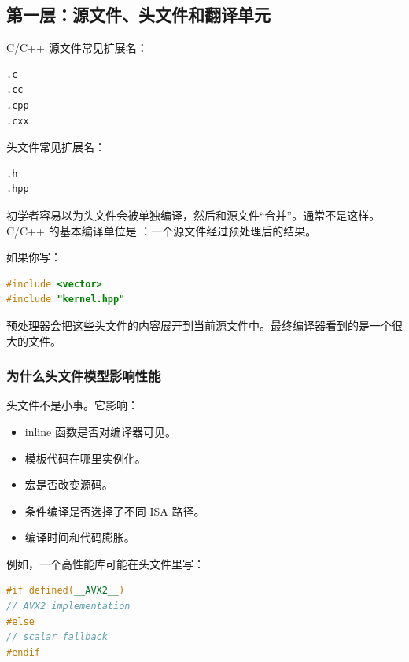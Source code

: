 \subsection{第一层：源文件、头文件和翻译单元}

C/C++ 源文件常见扩展名：

\begin{center}
\begin{verbatim}
.c
.cc
.cpp
.cxx
\end{verbatim}
\end{center}

头文件常见扩展名：

\begin{center}
\begin{verbatim}
.h
.hpp
\end{verbatim}
\end{center}

初学者容易以为头文件会被单独编译，然后和源文件“合并”。通常不是这样。C/C++ 的基本编译单位是 ：一个源文件经过预处理后的结果。

如果你写：

\begin{lstlisting}[language=C++]
#include <vector>
#include "kernel.hpp"
\end{lstlisting}

预处理器会把这些头文件的内容展开到当前源文件中。最终编译器看到的是一个很大的文件。

\subsubsection{为什么头文件模型影响性能}

头文件不是小事。它影响：

\begin{itemize}
  \item inline 函数是否对编译器可见。
  \item 模板代码在哪里实例化。
  \item 宏是否改变源码。
  \item 条件编译是否选择了不同 ISA 路径。
  \item 编译时间和代码膨胀。
\end{itemize}

例如，一个高性能库可能在头文件里写：

\begin{lstlisting}[language=C++]
#if defined(__AVX2__)
// AVX2 implementation
#else
// scalar fallback
#endif
\end{lstlisting}

